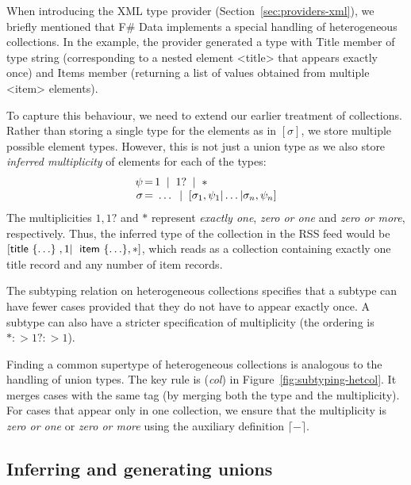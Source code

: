 \documentclass[preprint]{sigplanconf}
\newcommand{\ident}[1]{\textnormal{\sffamily #1}}
\newcommand{\lsep}[0]{\;\; | \;\;}
\newcommand{\narrow}[1]{\hspace{-0.85em} #1 \hspace{-0.85em}}
\newcommand{\addopt}[1]{\lceil#1\rceil}
\begin{document}
When introducing the XML type provider (Section~\ref{sec:providers-xml}), we briefly mentioned 
that F\# Data implements a special handling of heterogeneous collections. In the example, the provider
generated a type with \ident{Title} member of type \ident{string} (corresponding to a nested element
{\ttfamily\small <title>} that appears exactly once) and \ident{Items} member (returning a list of
values obtained from multiple {\ttfamily\small <item>} elements).

To capture this behaviour, we need to extend our earlier treatment of collections. Rather than storing
a single type for the elements as in $[\sigma]$, we store multiple possible element types. However,
this is not just a union type as we also store \emph{inferred multiplicity} of elements for 
each of the types:
%
\begin{equation*}
\begin{array}{rcl}
 \psi &\narrow{=}& 1 \lsep 1? \lsep \ast \\
 \sigma &\narrow{=}& ~\ldots \lsep [\sigma_1, \psi_1 | \ldots | \sigma_n, \psi_n ]
\end{array}
\end{equation*}
%
The multiplicities $1, 1?$ and $\ast$ represent \emph{exactly one}, \emph{zero or one} and \emph{zero or more},
respectively. Thus, the inferred type of the collection in the RSS feed would be
$[\ident{title}~\{ \ldots \}\;,1|\;\ident{item}~\{ \ldots \},\ast]$, which reads as a collection
containing exactly one \ident{title} record and any number of \ident{item} records.

The subtyping relation on heterogeneous collections specifies that a subtype can have fewer cases 
provided that they do not have to appear exactly once. A subtype can also have a stricter specification
of multiplicity (the ordering is $\ast :> 1? :> 1$). 

Finding a common supertype of heterogeneous collections is analogous to the handling of union types.
The key rule is (\emph{col}) in Figure~\ref{fig:subtyping-hetcol}. It merges cases with the same tag
(by merging both the type and the multiplicity). For cases that appear only in one collection, we ensure
that the multiplicity is \emph{zero or one} or \emph{zero or more} using the auxiliary definition
$\addopt{-}$.

  
\subsection{Inferring and generating unions}
\label{sec:impl-unions}
\end{document}
